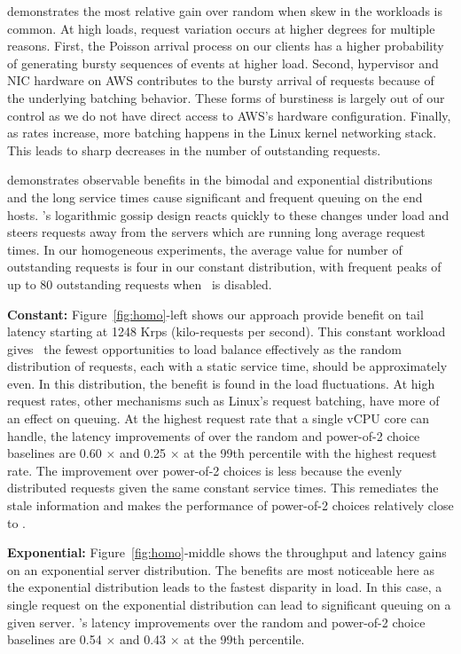 \daronpon demonstrates the most relative gain over random when skew in the workloads
is common. At high loads, request variation occurs at higher degrees for
multiple reasons. First, the Poisson arrival process on our clients has a
higher probability of generating bursty sequences of events at higher load.
Second, hypervisor and NIC hardware on AWS contributes to the bursty arrival of
requests because of the underlying batching behavior.  These forms of
burstiness is largely out of our control as we do not have direct access to
AWS's hardware configuration.  Finally, as rates increase, more batching
happens in the Linux kernel networking stack. This leads to sharp decreases in
the number of outstanding requests. 

\daronpon demonstrates observable benefits in the bimodal and exponential
distributions and the long service times cause significant and frequent queuing
on the end hosts. \daronpon's logarithmic gossip design reacts quickly to these
changes under load and steers requests away from the servers which are running
long average request times.  In our homogeneous experiments, the average value
for number of outstanding requests is four in our constant distribution, with
frequent peaks of up to 80 outstanding requests when \daronpon\ is disabled.

\noindent\textbf{Constant:} Figure~\ref{fig:homo}-left shows our approach provide benefit
on tail latency starting at 1248 Krps (kilo-requests per second).  This constant
workload gives \daronpon\ the fewest opportunities to load balance effectively
as the random distribution of requests, each with a static service time, should
be approximately even. In this distribution, the benefit is found in the load
fluctuations. At high request rates, other mechanisms such as Linux's request
batching, have more of an effect on queuing.
%
At the highest request rate that a single vCPU core can handle, the latency
improvements of \daronpon over the random and power-of-2 choice baselines are 
0.60 $\times$ and 0.25 $\times$ at the 99th percentile with the highest request rate. 
%
The improvement over power-of-2 choices is less because the evenly distributed requests given the same constant service times. This remediates the stale information and makes the performance of power-of-2 choices relatively close to \daronpon.    

\noindent\textbf{Exponential:} Figure~\ref{fig:homo}-middle shows the throughput and
latency gains on an exponential server distribution. The benefits are most
noticeable here as the exponential distribution leads to the fastest disparity
in load. In this case, a single request on the exponential distribution can
lead to significant queuing on a given server. 
%
\daronpon's latency improvements over the random and power-of-2 choice baselines are 
0.54 $\times$ and 0.43 $\times$ at the 99th percentile. 

